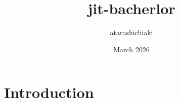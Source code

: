 \documentclass{article}
\title{jit-bacherlor}
\author{atarashichiaki }
\date{March 2026}
\begin{document}
\maketitle

\section{Introduction}
\end{document}
